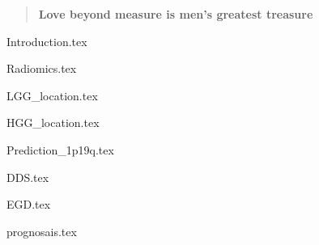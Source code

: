 \documentclass[10pt,twoside,openright]{memoir}
\begin{document}

\begingroup
\let\cleardoublepage\clearpage
\maketitle
\makecopyrightpage
\makethesispage
\makecommitteepage
\endgroup


\thispagestyle{empty}
\vspace*{\fill}
\begin{quote}
\centering
\textbf{Love beyond measure is men's greatest treasure}
\end{quote}
\vspace*{\fill}

\clearemptydoublepage

\frontmatter
\tableofcontents*

\clearemptydoublepage

\mainmatter
\thumbtrue


{Introduction.tex}
\clearemptydoublepage


{{Radiomics.tex}}
\clearemptydoublepage

{LGG_location.tex}
\clearemptydoublepage

{HGG_location.tex}
\clearemptydoublepage

{Prediction_1p19q.tex}
\clearemptydoublepage

{DDS.tex}
\clearemptydoublepage

{EGD.tex}
\clearemptydoublepage


{prognosais.tex}
\clearemptydoublepage
\end{document}
